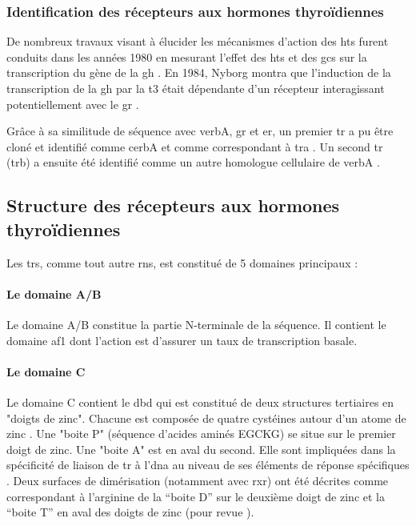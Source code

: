\documentclass[../main.tex]{subfiles}
\begin{document}
\subsubsection{Identification des récepteurs aux hormones thyroïdiennes}
De nombreux travaux visant à élucider les mécanismes d'action des \glspl{ht} furent conduits dans les années 1980 en mesurant l'effet des \glspl{ht} et des \glspl{gc} sur la transcription du gène de la \gls{gh} .
En 1984, Nyborg montra que l'induction de la transcription de la \gls{gh} par la \gls{t3} était dépendante d'un récepteur interagissant potentiellement avec le \gls{gr} \citep{Nyborg1984}.
\par
Grâce à sa similitude de séquence avec \gls{verbA}, \gls{gr} et \gls{er}, un premier \gls{tr} a pu être cloné et identifié comme \gls{cerbA} et comme correspondant à \gls{tra} \citep{Sap1986,Weinberger1986}.
Un second \gls{tr} (\gls{trb}) a ensuite été identifié comme un autre homologue cellulaire de \gls{verbA} \citep{Thompson1987}.


\subsection{Structure des récepteurs aux hormones thyroïdiennes}\label{subsubsec:struct-tr}
Les \glspl{tr}, comme tout autre \glspl{rn}, est constitué de 5 domaines principaux :

\paragraph{Le domaine A/B}
Le domaine A/B constitue la partie N-terminale de la séquence.
Il contient le domaine \gls{af1} dont l'action est d'assurer un taux de transcription basale.

\paragraph{Le domaine C}
Le domaine C contient le \gls{dbd} qui est constitué de deux structures tertiaires en "doigts de zinc".
Chacune est composée de quatre cystéines autour d'un atome de zinc \citep{Evans1988}.
Une "boite P" (séquence d'acides aminés EGCKG) se situe sur le premier doigt de zinc.
Une "boite A" est en aval du second.
Elle sont impliquées dans la spécificité de liaison de \gls{tr} à l'\gls{dna} au niveau de ses éléments de réponse spécifiques \citep{Nelson1993}.
Deux surfaces de dimérisation (notamment avec \gls{rxr}) ont été décrites comme correspondant à l’arginine de la ``boite D'' sur le deuxième doigt de zinc et la ``boite T'' en aval des doigts de zinc (pour revue \citealp{Bain2007}).
\end{document}
